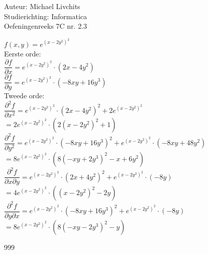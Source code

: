 \documentclass[a4paper]{article}
\begin{document}
  
\noindent \large Auteur: Michael Livchits \\
\noindent \large Studierichting: Informatica\\
\noindent \large Oefeningenreeks 7C nr. 2.3\\

\medskip

\normalsize

$f(x,y)= e^{(x-2y^2)^2}$\\
	
Eerste orde:\\
	
$\dfrac{\partial f}{\partial x} = e^{(x-2y^2)^2}\cdot(2x-4y^2)$\\
	
$\dfrac{\partial f}{\partial y} = e^{(x-2y^2)^2}\cdot(-8xy+16y^3)$\\

Tweede orde:\\
	
$\dfrac{\partial^2 f}{\partial x^2} = e^{(x-2y^2)^2}\cdot(2x-4y^2)^2+2e^{(x-2y^2)^2}$\\

$= 2e^{(x-2y^2)^2}\cdot\left(2(x-2y^2)^2+1\right)$\\
	
$\dfrac{\partial^2 f}{\partial y^2} = e^{(x-2y^2)^2}\cdot(-8xy+16y^3)^2+e^{(x-2y^2)^2}\cdot(-8xy+48y^2)$\\

$= 8e^{(x-2y^2)^2}\cdot\left(8(-xy+2y^3)^2-x+6y^2\right)$\\
	
$\dfrac{\partial^2 f}{\partial x\partial y} = e^{(x-2y^2)^2}\cdot(2x+4y^2)^2+e^{(x-2y^2)^2}\cdot(-8y)$\\

$= 4e^{(x-2y^2)^2}\cdot\left((x-2y^2)^2-2y\right)$\\
	
$\dfrac{\partial^2 f}{\partial y\partial x} = e^{(x-2y^2)^2}\cdot(-8xy+16y^3)^2 + e^{(x-2y^2)^2}\cdot(-8y)$\\

$= 8e^{(x-2y^2)^2}\cdot\left(8(-xy-2y^3)^2-y\right)$\\

\begin{thebibliography}{999}
\end{thebibliography}
\end{document}
